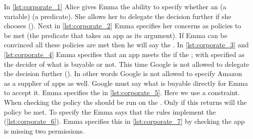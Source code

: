 \documentclass[]{llncs}
\begin{document}
In \autoref{lst:corporate_1} Alice gives Emma the ability to specify whether an  (a variable)  (a predicate).
She allows her to delegate the decision further if she chooses ().
Next in \autoref{lst:corporate_2} Emma specifies her concerns as policies to be met (the  predicate that takes an app as its argument).
If Emma can be convinced all these policies are met then he will say the .
In \autoref{lst:corporate_3} and \autoref{lst:corporate_4} Emma specifies that an app meets the  if the ;
  with  specified as the decider of what is buyable or not.
This time Google is not allowed to delegate the decision further ().
In other words Google is not allowed to specify Amazon as a supplier of apps as well.
Google must say what is buyable directly for Emma to accept it.
Emma specifies the  in \autoref{lst:corporate_5}.
Here we use a constraint.
When checking the policy the  should be run on the .
Only if this returns  will the policy be met.
To specify the  Emma says that the  rules implement the  (\autoref{lst:corporate_6}).
Emma specifies this in \autoref{lst:corporate_7} by checking the app is missing two permissions.
\end{document}
